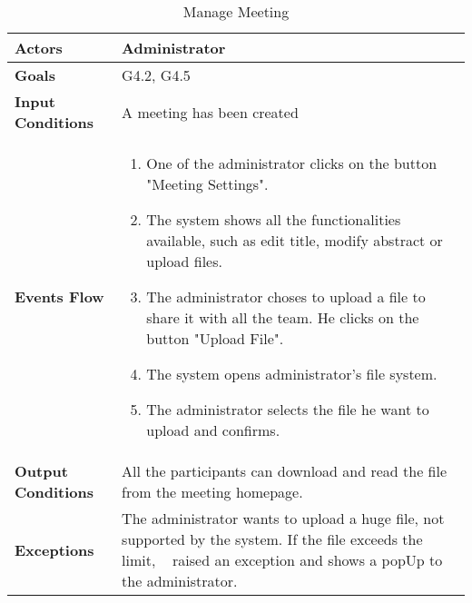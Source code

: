 \begin{table}[H]
\centering
\def\arraystretch{1.5}
\begin{tabular}{|p{7cm}|p{7cm}|}
	\hline
	\textbf{Actors}            & Administrator    \\ \hline
	\textbf{Goals}             & G4.2, G4.5           \\ \hline
	\textbf{Input Conditions}  & A meeting has been created           \\ \hline
	\textbf{Events Flow}       &  
	\begin{enumerate}[topsep=0pt, leftmargin=*]
		\item One of the administrator clicks on the button "Meeting Settings".
		\item The system shows all the functionalities available, such as edit title, modify abstract or upload files.
		\item The administrator choses to upload a file to share it with all the team. He clicks on the button "Upload File".
		\item The system opens administrator's file system.
		\item The administrator selects the file he want to upload and confirms.
	\end{enumerate}             \\ \hline
	\textbf{Output Conditions} & All the participants can download and read the file from the meeting homepage.          \\ \hline
	\textbf{Exceptions}        & The administrator wants  to upload a huge file, not supported by the system. If the file exceeds the limit, \projectname~ raised an exception and shows a popUp to the administrator. \\ \hline
\end{tabular}
\caption{Manage Meeting}
\end{table}

